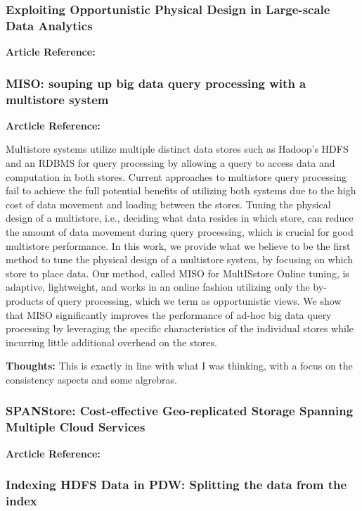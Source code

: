 \documentclass{article}
\begin{document}
\subsubsection{Exploiting Opportunistic Physical Design in Large-scale
               Data Analytics}

\textbf{Article Reference:} \cite{DBLP:journals/corr/abs-1303-6609}

\subsubsection{MISO: souping up big data query processing with a multistore system}

\textbf{Arcticle Reference:} \cite{LeFevre:2014:MSU:2588555.2588568}

Multistore systems utilize multiple distinct data stores such as Hadoop's HDFS and an RDBMS for query processing by allowing a query to access data and computation in both stores. Current approaches to multistore query processing fail to achieve the full potential benefits of utilizing both systems due to the high cost of data movement and loading between the stores. Tuning the physical design of a multistore, i.e., deciding what data resides in which store, can reduce the amount of data movement during query processing, which is crucial for good multistore performance. In this work, we provide what we believe to be the first method to tune the physical design of a multistore system, by focusing on which store to place data. Our method, called MISO for MultISstore Online tuning, is adaptive, lightweight, and works in an online fashion utilizing only the by-products of query processing, which we term as opportunistic views. We show that MISO significantly improves the performance of ad-hoc big data query processing by leveraging the specific characteristics of the individual stores while incurring little additional overhead on the stores.

\textbf{Thoughts:} This is exactly in line with what I was thinking, with a focus on the consistency aspects and some algrebras.

\subsubsection{SPANStore: Cost-effective Geo-replicated Storage Spanning Multiple Cloud Services}

\textbf{Arcticle Reference:} \cite{Wu:2013:SCG:2517349.2522730}

\subsubsection{Indexing HDFS Data in PDW: Splitting the data from the index}
\end{document}
